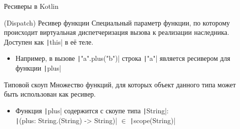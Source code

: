 \documentclass[handout,aspectratio=169,usenames,dvipsnames]{beamer}
\begin{document}
    \begin{frame}[fragile]{Ресиверы в Kotlin}
        \begin{block}{(Dispatch) Ресивер функции}
            Специальный параметр функции, по которому происходит виртуальная диспетчеризация вызова к реализации наследника.
            Доступен как \texttt|this| в её теле.
            \begin{itemize}
                \item Например, в вызове \texttt|"a".plus("b")| строка \texttt|"a"| является ресивером для функции \texttt|plus|
            \end{itemize}
        \end{block}
        \pause
        \begin{block}{Типовой скоуп}
            Множество функций, для которых объект данного типа может быть использован как ресивер.
            \begin{itemize}
                \item Функция \texttt|plus| содержится с скоупе типа \texttt|String|: \\
                \texttt|(plus: String.(String) -> String)| $\in$ \texttt|scope(String)|
            \end{itemize}
        \end{block}
    \end{frame}
\end{document}
